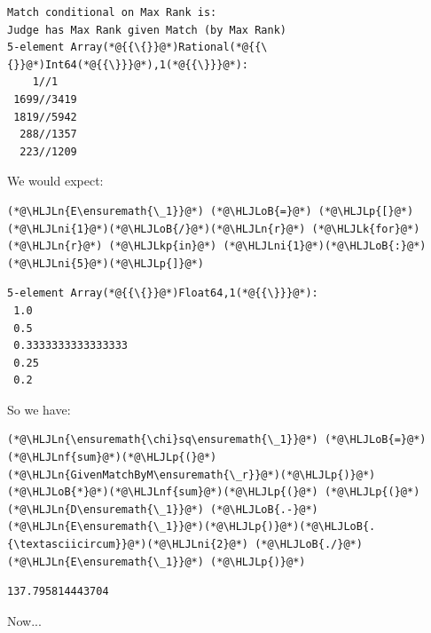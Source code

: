 \documentclass[12pt,a4paper]{article}
\newcommand{\HLJLk}[1]{\textcolor[RGB]{148,91,176}{\textbf{#1}}}
\newcommand{\HLJLkp}[1]{\textcolor[RGB]{148,91,176}{\textbf{#1}}}
\newcommand{\HLJLn}[1]{#1}
\newcommand{\HLJLnf}[1]{\textcolor[RGB]{66,102,213}{#1}}
\newcommand{\HLJLni}[1]{\textcolor[RGB]{59,151,46}{#1}}
\newcommand{\HLJLoB}[1]{\textcolor[RGB]{102,102,102}{\textbf{#1}}}
\newcommand{\HLJLp}[1]{#1}
\begin{document}
\begin{lstlisting}
Match conditional on Max Rank is:
Judge has Max Rank given Match (by Max Rank)
5-element Array(*@{{\{}}@*)Rational(*@{{\{}}@*)Int64(*@{{\}}}@*),1(*@{{\}}}@*):
    1//1
 1699//3419
 1819//5942
  288//1357
  223//1209
\end{lstlisting}


We would expect:


\begin{lstlisting}
(*@\HLJLn{E\ensuremath{\_1}}@*) (*@\HLJLoB{=}@*) (*@\HLJLp{[}@*)(*@\HLJLni{1}@*)(*@\HLJLoB{/}@*)(*@\HLJLn{r}@*) (*@\HLJLk{for}@*) (*@\HLJLn{r}@*) (*@\HLJLkp{in}@*) (*@\HLJLni{1}@*)(*@\HLJLoB{:}@*)(*@\HLJLni{5}@*)(*@\HLJLp{]}@*)
\end{lstlisting}

\begin{lstlisting}
5-element Array(*@{{\{}}@*)Float64,1(*@{{\}}}@*):
 1.0
 0.5
 0.3333333333333333
 0.25
 0.2
\end{lstlisting}


So we have:


\begin{lstlisting}
(*@\HLJLn{\ensuremath{\chi}sq\ensuremath{\_1}}@*) (*@\HLJLoB{=}@*) (*@\HLJLnf{sum}@*)(*@\HLJLp{(}@*)(*@\HLJLn{GivenMatchByM\ensuremath{\_r}}@*)(*@\HLJLp{)}@*)(*@\HLJLoB{*}@*)(*@\HLJLnf{sum}@*)(*@\HLJLp{(}@*) (*@\HLJLp{(}@*)(*@\HLJLn{D\ensuremath{\_1}}@*) (*@\HLJLoB{.-}@*) (*@\HLJLn{E\ensuremath{\_1}}@*)(*@\HLJLp{)}@*)(*@\HLJLoB{.{\textasciicircum}}@*)(*@\HLJLni{2}@*) (*@\HLJLoB{./}@*) (*@\HLJLn{E\ensuremath{\_1}}@*) (*@\HLJLp{)}@*)
\end{lstlisting}

\begin{lstlisting}
137.795814443704
\end{lstlisting}


Now...
\end{document}
